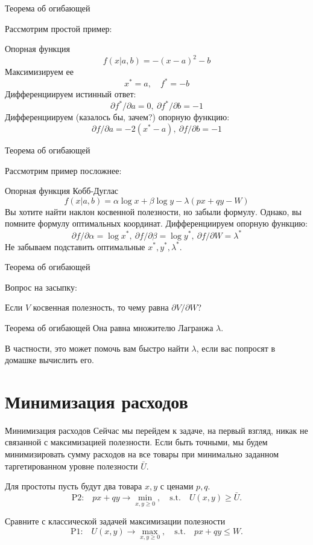 \documentclass{beamer}
\begin{document}
\begin{frame}{Теорема об огибающей}

Рассмотрим простой пример:

Опорная функция $$ f(x|a,b) = - (x-a)^2 - b $$
Максимизируем ее $$ x^{\ast} = a, \quad f^{\ast} = - b $$
Дифференциируем истинный ответ: $$\partial f^{\ast}/\partial a = 0, \ \partial f^{\ast}/\partial b = -1$$
Дифференциируем (казалось бы, зачем?) опорную функцию: $$\partial f/\partial a = -2(x^{\ast}-a), \ \partial f/\partial b = -1$$
\end{frame}

\begin{frame}{Теорема об огибающей}

Рассмотрим пример посложнее:

Опорная функция Кобб-Дуглас $$ f(x|a,b) = \alpha \log x + \beta \log y - \lambda (px + qy - W) $$
Вы хотите найти наклон косвенной полезности, но забыли формулу. Однако, вы помните формулу оптимальных координат.
Дифференциируем опорную функцию: $$\partial f/\partial \alpha = \log x^{\ast}, \ \partial f/\partial \beta = \log y^{\ast}, \ \partial f/\partial W = \lambda^{\ast}$$
Не забываем подставить оптимальные $x^{\ast}, y^{\ast}, \lambda^{\ast}$.
\end{frame}

\begin{frame}{Теорема об огибающей}

Вопрос на засыпку: 

Если $V$ косвенная полезность, то чему равна $\partial V/ \partial W$?
\end{frame}

\begin{frame}{Теорема об огибающей}
Она равна множителю Лагранжа $\lambda$.

В частности, это может помочь вам быстро найти $\lambda$, если вас попросят в домашке вычислить его.
\end{frame}

\section{Минимизация расходов}

\begin{frame}{Минимизация расходов}
Сейчас мы перейдем к задаче, на первый взгляд, никак не связанной с максимизацией полезности. Если быть точными, мы будем минимизировать сумму расходов на все товары при минимально заданном таргетированном уровне полезности $\bar U$. 

Для простоты пусть будут два товара $x, y$ с ценами $p, q$. 
$$\text{P2:} \quad p x + q y \to \min_{x,y \geqslant 0}, \quad \text{s.t.} \quad U(x,y) \geqslant \bar U.$$

Сравните с классической задачей максимизации полезности
$$\text{P1:} \quad U(x, y) \to \max_{x,y \geqslant 0}, \quad \text{s.t.} \quad p x + q y \leqslant W.$$
\end{frame}
\end{document}
